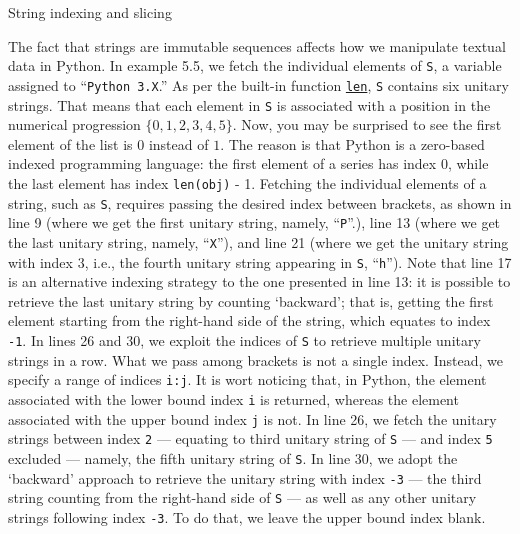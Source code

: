 \documentclass[a4paper,11pt]{book}
\newcommand{\question}[1]{%
    \begin{tcolorbox}[colback=comp_c!10,colframe=comp_c,sidebyside align=top,width=\linewidth,before skip=1ex]
        #1
    \end{tcolorbox}%
    \switchcolumn%
}
\newcommand{\note}[1]{%
    \begin{tcolorbox}[colback=white!0,colframe=white!10,width=\linewidth,before skip=1ex]
        #1
    \end{tcolorbox}         
}
\begin{document}
\begin{paracol}{2}
	\question{String indexing and slicing}
	\note{The fact that strings are immutable sequences affects how we manipulate textual data in Python. In example 5.5, we fetch the individual elements of \texttt{S}, a variable assigned to ``\texttt{Python 3.X}.'' As per the built-in function \href{https://docs.python.org/3/tutorial/introduction.html#strings}{\texttt{len}}, \texttt{S} contains six unitary strings. That means that each element in \texttt{S} is associated with a position in the numerical progression $\{0, 1, 2, 3, 4, 5\}$. Now, you may be surprised to see the first element of the list is $0$ instead of $1$. The reason is that Python is a zero-based indexed programming language: the first element of a series has index $0$, while the last element has index \texttt{len(obj)} - 1.  Fetching the individual elements of a string, such as \texttt{S}, requires passing the desired index between brackets, as shown in line 9 (where we get the first unitary string, namely, ``\texttt{P}''.), line 13 (where we get the last unitary string, namely, ``\texttt{X}''), and line 21 (where we get the unitary string with index $3$, i.e., the fourth unitary string appearing in \texttt{S}, ``\texttt{h}''). Note that line 17 is an alternative indexing strategy to the one presented in line 13: it is possible to retrieve the last unitary string by counting `backward'; that is, getting the first element starting from the right-hand side of the string, which equates to index \texttt{-1}. In lines 26 and 30, we exploit the indices of \texttt{S} to retrieve multiple unitary strings in a row. What we pass among brackets is not a single index. Instead, we specify a range of indices \texttt{i:j}. It is wort noticing that, in Python, the element associated with the lower bound index \texttt{i} is returned, whereas the element associated with the upper bound index \texttt{j} is not. In line 26, we fetch the unitary strings between index \texttt{2} --- equating to third unitary string of \texttt{S} --- and index \texttt{5} excluded --- namely, the fifth unitary string of \texttt{S}. In line 30, we adopt the `backward' approach to retrieve the unitary string with index \texttt{-3} --- the third string counting from the right-hand side of \texttt{S} --- as well as any other unitary strings following index \texttt{-3}. To do that, we leave the upper bound index blank.} 
\end{paracol}
\clearpage
\end{document}
